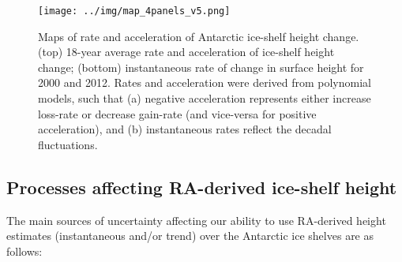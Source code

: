 \begin{figure}[!ht]
  \texttt{[image: ../img/map\_4panels\_v5.png]}
  \caption{
  Maps of rate and acceleration of Antarctic ice-shelf height change. (top) 18-year average rate and acceleration of ice-shelf height change; (bottom) instantaneous rate of change in surface height for 2000 and 2012. Rates and acceleration were derived from polynomial models, such that (a) negative acceleration represents either increase loss-rate or decrease gain-rate (and vice-versa for positive acceleration), and (b) instantaneous rates reflect the decadal fluctuations.
  } 
  \label{c2f9}
\end{figure}


\subsection{Processes affecting RA-derived ice-shelf height}

The main sources of uncertainty affecting our ability to use RA-derived height estimates (instantaneous and/or trend) over the Antarctic ice shelves are as follows:

